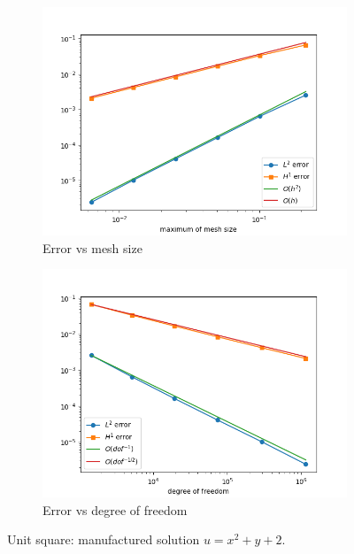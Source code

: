 \documentclass[12pt]{article}%
\theoremstyle{plain}
\numberwithin{equation}{section}
\begin{document}
 \begin{figure}[H]%
    \centering
         \begin{subfigure}[h]{0.45\linewidth}
          \caption{Error vs mesh size}
\includegraphics[width=\linewidth]{figures/Ex3/Ex3_test2.png}
\end{subfigure}
  \begin{subfigure}[h]{0.45\linewidth}
   \caption{Error vs degree of freedom}
\includegraphics[width=\linewidth]{figures/Ex3/Ex3_test2_dof.png}
\end{subfigure}
  \caption{Unit square: manufactured solution $u=x^2+y+2$.}
  \label{fig:Ex3_test_2}
 \end{figure}
 
\end{document}
